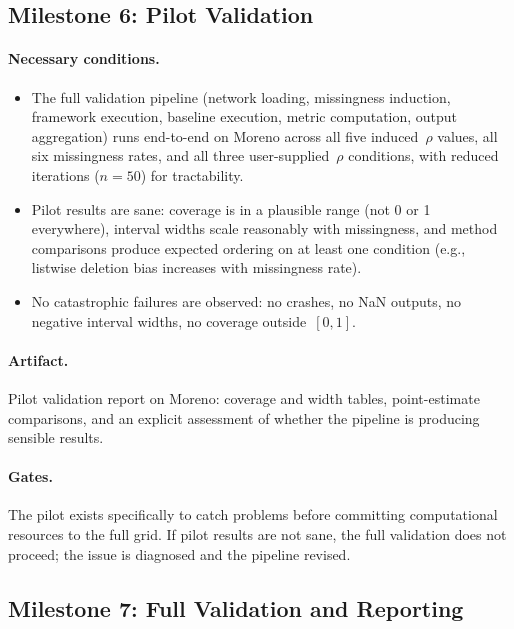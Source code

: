 \documentclass[11pt]{article}
\begin{document}
\subsection*{Milestone 6: Pilot Validation}

\paragraph{Necessary conditions.}
\begin{itemize}[leftmargin=*, itemsep=2pt]
  \item The full validation pipeline (network loading, missingness induction, framework execution, baseline execution, metric computation, output aggregation) runs end-to-end on Moreno across all five induced~$\rho$ values, all six missingness rates, and all three user-supplied~$\rho$ conditions, with reduced iterations ($n = 50$) for tractability.
  \item Pilot results are sane: coverage is in a plausible range (not 0 or 1 everywhere), interval widths scale reasonably with missingness, and method comparisons produce expected ordering on at least one condition (e.g., listwise deletion bias increases with missingness rate).
  \item No catastrophic failures are observed: no crashes, no NaN outputs, no negative interval widths, no coverage outside~$[0, 1]$.
\end{itemize}

\paragraph{Artifact.} Pilot validation report on Moreno: coverage and width tables, point-estimate comparisons, and an explicit assessment of whether the pipeline is producing sensible results.

\paragraph{Gates.} The pilot exists specifically to catch problems before committing computational resources to the full grid. If pilot results are not sane, the full validation does not proceed; the issue is diagnosed and the pipeline revised.

\subsection*{Milestone 7: Full Validation and Reporting}
\end{document}

